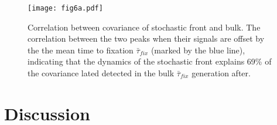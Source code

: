 \documentclass[9pt,twocolumn,twoside]{gsajnl}
\begin{document}
\begin{figure}[!ht]
\texttt{[image: fig6a.pdf]}
\caption{Correlation between covariance of stochastic front and bulk.  The correlation between the two peaks when their signals are offset by the the mean time to fixation $\bar{\tau}_{fix}$ (marked by the blue line), indicating that the dynamics of the stochastic front explains 69\% of the covariance lated detected in the bulk $\bar{\tau}_{fix}$ generation after.}\label{fig:6}
% 
% 
\end{figure}

\section*{Discussion}
\end{document}
